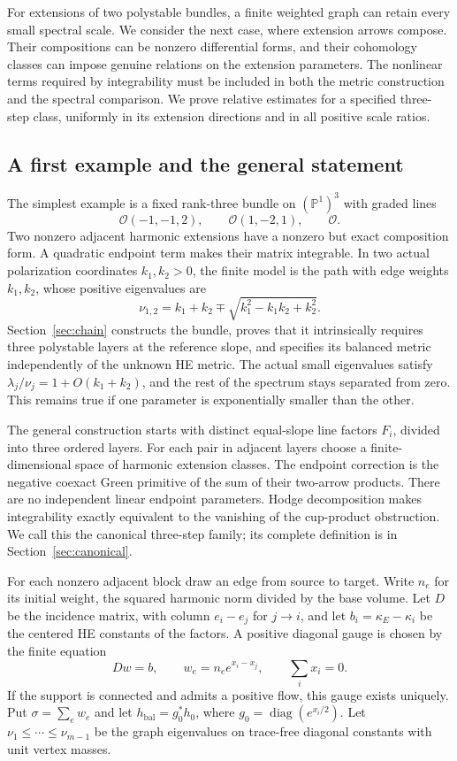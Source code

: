 \documentclass[11pt]{amsart}
\theoremstyle{definition}
\theoremstyle{remark}
\newcommand{\PP}{\mathbb P}
\newcommand{\cO}{\mathcal O}
\newcommand{\diag}{\operatorname{diag}}
\begin{document}
For extensions of two polystable bundles, a finite weighted graph can
retain every small spectral scale. We consider the next case, where
extension arrows compose. Their compositions can be nonzero differential
forms, and their cohomology classes can impose genuine relations on the
extension parameters. The nonlinear terms required by integrability must
be included in both the metric construction and the spectral comparison.
We prove relative estimates for a specified three-step class, uniformly
in its extension directions and in all positive scale ratios.

\subsection{A first example and the general statement}
The simplest example is a fixed rank-three bundle on $(\PP^1)^3$ with
graded lines
\[
 \cO(-1,-1,2),\qquad \cO(1,-2,1),\qquad \cO.
\]
Two nonzero adjacent harmonic extensions have a nonzero but exact
composition form. A quadratic endpoint term makes their matrix
integrable. In two actual polarization coordinates $k_1,k_2>0$, the
finite model is the path with edge weights $k_1,k_2$, whose positive
eigenvalues are
\[
 \nu_{1,2}=k_1+k_2\mp\sqrt{k_1^2-k_1k_2+k_2^2}.
\]
Section~\ref{sec:chain} constructs the bundle, proves that it intrinsically
requires three polystable layers at the reference slope, and specifies
its balanced metric independently of the unknown HE metric. The actual
small eigenvalues satisfy $\lambda_j/\nu_j=1+O(k_1+k_2)$, and the rest
of the spectrum stays separated from zero. This remains true if one
parameter is exponentially smaller than the other.

The general construction starts with distinct equal-slope line factors
$F_i$, divided into three ordered layers. For each pair in adjacent layers
choose a finite-dimensional space of harmonic extension classes. The
endpoint correction is the negative coexact Green primitive of the sum
of their two-arrow products. There are no independent linear endpoint
parameters. Hodge decomposition makes integrability exactly equivalent
to the vanishing of the cup-product obstruction. We call this the
canonical three-step family; its complete definition is in
Section~\ref{sec:canonical}.

For each nonzero adjacent block draw an edge from source to target. Write
$n_e$ for its initial weight, the squared harmonic norm divided by the base volume.
Let $D$ be the incidence matrix, with column $e_i-e_j$ for $j\to i$,
and let $b_i=\kappa_E-\kappa_i$ be the centered HE constants of the
factors. A positive diagonal gauge is chosen by the finite equation
\[
 Dw=b,\qquad w_e=n_e e^{x_i-x_j},\qquad \sum_i x_i=0.
\]
If the support is connected and admits a positive flow, this gauge exists
uniquely. Put $\sigma=\sum_e w_e$ and let
$h_{\mathrm{bal}}=g_0^*h_0$, where $g_0=\diag(e^{x_i/2})$.
Let $\nu_1\le\cdots\le\nu_{m-1}$ be the graph eigenvalues on
trace-free diagonal constants with unit vertex masses.
\end{document}
